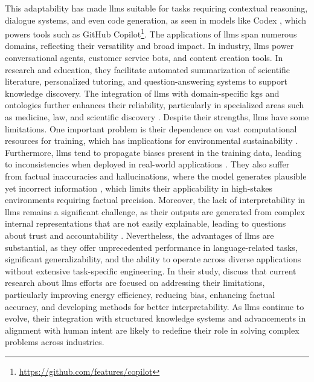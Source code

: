This adaptability has made \glspl{llm} suitable for tasks requiring contextual reasoning, dialogue systems, and even code generation, as seen in models like Codex \cite{Chen2021EvaluatingLL}, which powers tools such as GitHub Copilot\footnote{\url{https://github.com/features/copilot}}.
The applications of \glspl{llm} span numerous domains, reflecting their versatility and broad impact.
In industry, \glspl{llm} power conversational agents, customer service bots, and content creation tools.
In research and education, they facilitate automated summarization of scientific literature, personalized tutoring, and question-answering systems to support knowledge discovery.
The integration of \glspl{llm} with domain-specific \glspl{kg} and ontologies further enhances their reliability, particularly in specialized areas such as medicine, law, and scientific discovery \cite{Yang2024}.
Despite their strengths, \glspl{llm} have some limitations.
One important problem is their dependence on vast computational resources for training, which has implications for environmental sustainability \cite{Strubell2019EnergyAP}.
Furthermore, \glspl{llm} tend to propagate biases present in the training data, leading to inconsistencies when deployed in real-world applications \cite{Naveed2023}.
They also suffer from factual inaccuracies and hallucinations, where the model generates plausible yet incorrect information \cite{Chang2024}, which limits their applicability in high-stakes environments requiring factual precision.
Moreover, the lack of interpretability in \glspl{llm} remains a significant challenge, as their outputs are generated from complex internal representations that are not easily explainable, leading to questions about trust and accountability \cite{Naveed2023}.
Nevertheless, the advantages of \glspl{llm} are substantial, as they offer unprecedented performance in language-related tasks, significant generalizability, and the ability to operate across diverse applications without extensive task-specific engineering.
In their study, \textcite{Naveed2023} discuss that current research about \glspl{llm} efforts are focused on addressing their limitations, particularly improving energy efficiency, reducing bias, enhancing factual accuracy, and developing methods for better interpretability.
As \glspl{llm} continue to evolve, their integration with structured knowledge systems and advancements in alignment with human intent are likely to redefine their role in solving complex problems across industries.
